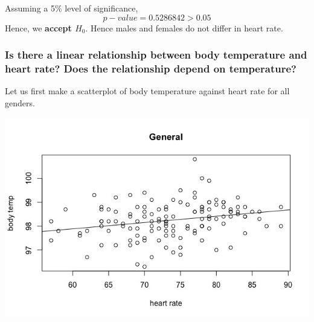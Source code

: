 \documentclass[12pt,letterpaper,titlepage,en-US]{article}
\begin{document}
Assuming a 5\% level of significance,\\
\begin{equation}
p-value = 0.5286842 > 0.05
\end{equation}
Hence, we \textbf{accept $H_{0}$}. Hence males and females do not differ in heart rate.



\subsubsection{Is there a linear relationship between body temperature and heart rate? Does the relationship depend on temperature?}
Let us first make a scatterplot of body temperature against heart rate for all genders.

\includegraphics[scale=0.6]{linear.jpeg}\\
\end{document}
